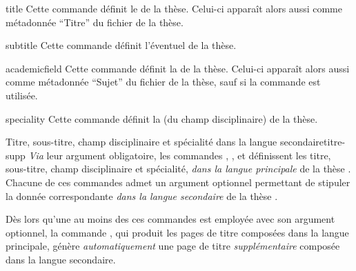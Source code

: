 %
\begin{docCommand}[doc description=\mandatory]{title}{}%
  Cette commande définit le  de la thèse. Celui-ci apparaît alors
  aussi comme métadonnée \enquote{Titre} du fichier \pdf{} de la thèse.
\end{docCommand}
%
\begin{docCommand}{subtitle}{}%
  Cette commande définit l'éventuel  de
  la thèse.
\end{docCommand}
%
\begin{docCommand}[doc description=\mandatory]{academicfield}{}%
  Cette commande définit la  
  de la thèse. Celui-ci apparaît alors aussi comme métadonnée \enquote{Sujet} du
  fichier \pdf{} de la thèse, sauf si la commande  est utilisée.
\end{docCommand}
%
\begin{docCommand}{speciality}{}%
  Cette commande définit la  (du champ
  disciplinaire) de la thèse.
\end{docCommand}
%
\begin{dbremark}{Titre, sous-titre, champ disciplinaire et spécialité dans la
    langue secondaire}{titre-supp}%
  \emph{Via} leur argument obligatoire, les commandes ,
  ,  et  définissent
  les titre, sous-titre, champ disciplinaire et spécialité, \emph{dans la
    langue principale} de la thèse . Chacune de
  ces commandes admet un argument optionnel permettant de stipuler la donnée
  correspondante \emph{dans la langue secondaire} de la thèse .

  Dès lors qu'une au moins des ces commandes est employée avec son argument
  optionnel, la commande , qui produit les pages de titre
  composées dans la langue principale, génère \emph{automatiquement} une page
  de titre \emph{supplémentaire} composée dans la langue secondaire.
\end{dbremark}
